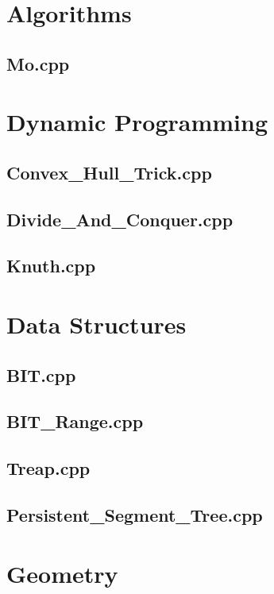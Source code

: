 \section{Algorithms}
\subsection{Mo.cpp}

\section{Dynamic Programming}
\subsection{Convex\_Hull\_Trick.cpp}

\subsection{Divide\_And\_Conquer.cpp}

\subsection{Knuth.cpp}

\section{Data Structures}
\subsection{BIT.cpp}

\subsection{BIT\_Range.cpp}

\subsection{Treap.cpp}

\subsection{Persistent\_Segment\_Tree.cpp}

\section{Geometry}
